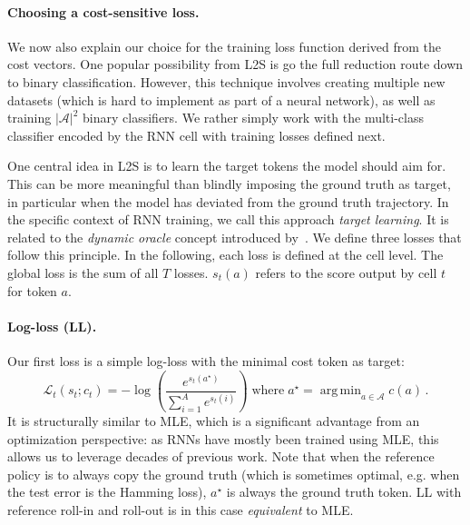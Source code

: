 \documentclass{article}
\DeclareMathOperator*{\argmin}{arg\,min}
\begin{document}
	\vspace{-0.5mm}
	\paragraph{Choosing a cost-sensitive loss.}
	We now also explain our choice for the training loss function derived from the cost vectors.
	One popular possibility from L2S is go the full reduction route down to binary classification.
	However, this technique involves creating multiple new datasets (which is hard to implement as part of a neural network), as well as training $|\mathcal{A}|^2$ binary classifiers.
	We rather simply work with the multi-class classifier encoded by the RNN cell with training losses defined next.

	One central idea in L2S is to learn the target tokens the model should aim for.
	This can be more meaningful than blindly imposing the ground truth as target, in particular when the model has deviated from the ground truth trajectory.
	In the specific context of RNN training, we call this approach \emph{target learning}.
	It is related to the \emph{dynamic oracle} concept introduced by~\citet{Golberg2012}.
	We define three losses that follow this principle.
	In the following, each loss is defined at the cell level.
	The global loss is the sum of all $T$ losses.
	$s_t(a)$ refers to the score output by cell $t$ for token $a$.

	\paragraph{Log-loss (LL).}
	Our first loss is a simple log-loss with the minimal cost token as target:
	\begin{equation}
	\mathcal{L}_t(s_t; c_t) = -\log\left(\frac{e^{s_t(a^\star)}} {\textstyle\sum_{i=1}^A e^{s_t(i)}}\right)  \; \text{where} \; a^\star=\argmin_{a \in \mathcal{A}} c(a) \, .
	\end{equation}
	It is structurally similar to MLE, which is a significant advantage from an optimization perspective: as RNNs have mostly been trained using MLE, this allows us to leverage decades of previous work.
	Note that when the reference policy is to always copy the ground truth (which is sometimes optimal, e.g. when the test error is the Hamming loss), $a^\star$ is always the ground truth token.
	LL with reference roll-in and roll-out is in this case \emph{equivalent} to MLE.
\end{document}
